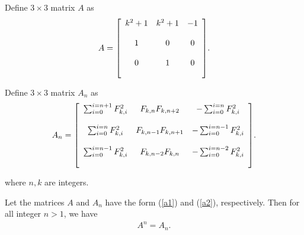 \begin{definition}\label{a1}
Define $3 \times 3$ matrix $A$ as 
\begin{align*}
A  = {\left[
          \begin{array}{ccc}
           \bigskip
            k^2+1 & k^2+1& -1 \\
             \bigskip
            1 & 0 & 0 \\
             \bigskip
            0 & 1 &0\\
          \end{array}
        \right]}.
\end{align*}
\end{definition}
\begin{definition}\label{a2}
Define $3 \times 3$ matrix $ A_{n}$ as 
\begin{align*}
 A_{n}  = {\left[
          \begin{array}{ccc}
           \bigskip
            \sum_{i=0}^{i=n+1}F_{k,i}^2 & F_{k,n}F_{k,n+2}& - \sum_{i=0}^{i=n}F_{k,i}^2 \\
            \bigskip
            \sum_{i=0}^{i=n}F_{k,i}^2 & F_{k,n-1} F_{k,n+1} & - \sum_{i=0}^{i=n-1}F_{k,i}^2 \\
             \bigskip
            \sum_{i=0}^{i=n-1}F_{k,i}^2 & F_{k,n-2}F_{k,n} &- \sum_{i=0}^{i=n-2}F_{k,i}^2
              \end{array}
        \right]}.
\end{align*}
\end{definition}
where  $n,k$ are integers.
\begin{theorem} Let the matrices $A$ and $A_{n}$ have the form (\ref{a1}) and (\ref{a2}), respectively. Then for all integer $n > 1$, we have
\begin{align*}
  A^n = A_{n}.
\end{align*}
\end{theorem}
